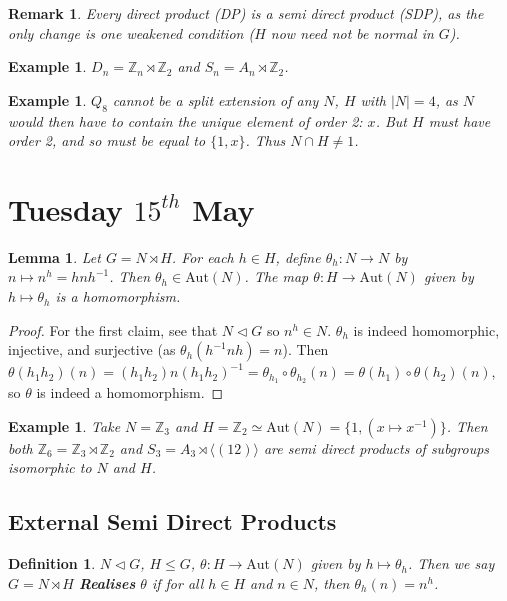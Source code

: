 \documentclass[a4paper,10pt]{article}
\newcommand{\ZZ}{\mathbb{Z}}
\newtheorem{Def}[thm]{Definition}
\newtheorem{eg}[thm]{Example}
\newtheorem{Lem}[thm]{Lemma}
\newtheorem{rem}[thm]{Remark}
\begin{document}
\begin{rem}
Every direct product (DP) is a semi direct product (SDP), as the only change is one weakened condition ($H$ now need not be normal in $G$).
\end{rem}

\begin{eg}
$D_n = \ZZ_n \rtimes \ZZ_2$ and $S_n = A_n \rtimes \ZZ_2$. 
\end{eg}

\begin{eg}
$Q_8$ cannot be a split extension of any $N$, $H$ with $|N| = 4$, as $N$ would then have to contain the unique element of order 2: $x$. But $H$ must have order 2, and so must be equal to $\{1 , x\}$. Thus $N \cap H \neq 1$. 
\end{eg}





\newpage
\section{Tuesday $15^{th}$ May}

\begin{Lem}
Let $G = N \rtimes H$. For each $h \in H$, define $\theta_h : N \rightarrow N$ by $n \mapsto n^h = h n h^{-1}$. Then $\theta_h \in \text{Aut}(N)$. The map $\theta : H \rightarrow \text{Aut}(N)$ given by $h \mapsto \theta_h$ is a homomorphism. 
\end{Lem}

\begin{proof}
For the first claim, see that $N \triangleleft G$ so $n^h \in N$. $\theta_h$ is indeed homomorphic, injective, and surjective (as $\theta_h(h^{-1} n h) = n$). Then $\theta(h_1 h_2) (n) = (h_1 h_2) n (h_1 h_2)^{-1} = \theta_{h_1} \circ \theta_{h_2} (n) = \theta(h_1) \circ \theta(h_2) (n)$, so $\theta$ is indeed a homomorphism.
\end{proof}

\begin{eg}
Take $N = \ZZ_3$ and $H = \ZZ_2 \simeq \text{Aut}(N) = \{ 1, (x \mapsto x^{-1}) \}$. Then both $\ZZ_6 = \ZZ_3 \rtimes \ZZ_2$ and $S_3 = A_3 \rtimes \langle (12) \rangle$ are semi direct products of subgroups isomorphic to $N$ and $H$. 
\end{eg}


\subsection{External Semi Direct Products}
%
\begin{Def}
$N \triangleleft G $, $H \leq G$, $\theta : H \rightarrow \text{Aut}(N)$ given by $h \mapsto \theta_h$. Then we say $G = N \rtimes H$ \textbf{Realises} $\theta$ if for all $h \in H$ and $n \in N$, then $\theta_h (n) = n^h$. 
\end{Def}
\end{document}
